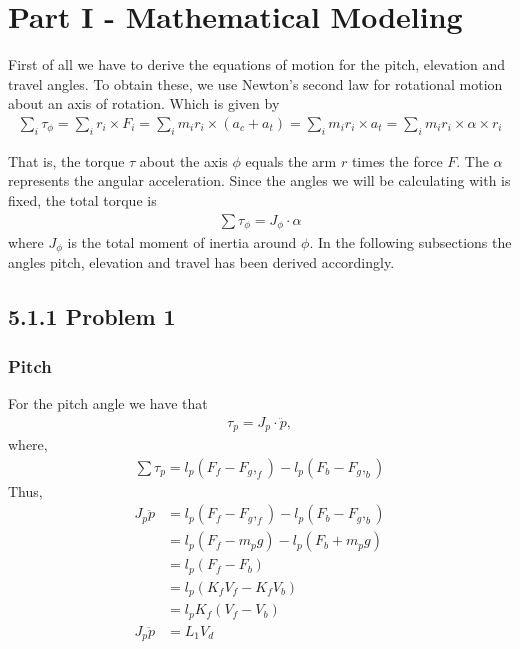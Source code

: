 \section*{Part I - Mathematical Modeling}
First of all we have to derive the equations of motion for the pitch, elevation and travel angles. To obtain these, we use Newton's second law for rotational motion about an axis of rotation. Which is given by
\begin{align*}
\sum_{i}\tau_\phi = \sum_{i}r_i\times F_i = \sum_{i}m_ir_i \times (a_c + a_t) = \sum_{i}m_ir_i \times a_t = \sum_{i}m_ir_i \times \alpha \times r_i
\end{align*} 

That is, the torque $\tau$ about the axis $\phi$ equals the arm $r$ times the force $F$. The $\alpha$ represents the angular acceleration. Since the angles we will be calculating with is fixed, the total torque is  
\begin{align*}
\sum\tau_\phi = J_\phi \cdot \alpha
\end{align*}
where $J_\phi$ is the total moment of inertia around $\phi$. In the following subsections the angles pitch, elevation and travel has been derived accordingly. 
\subsection*{5.1.1  Problem 1}
\subsubsection*{Pitch}
For the pitch angle we have that 
\begin{align*}
\tau_p = J_p\cdot \ddot{p},
\end{align*}
where,
\begin{align*}
\sum \tau_p = l_p(F_f-F_g,_f) - l_p(F_b-F_g,_b)
\end{align*}
Thus,
\begin{align*}
J_p \ddot{p} &= l_p(F_f-F_g,_f) - l_p(F_b-F_g,_b)\\
             &= l_p(F_f-m_pg) - l_p(F_b+ m_pg)\\
             &= l_p(F_f - F_b)\\
             &= l_p(K_fV_f - K_fV_b)\\
             &= l_pK_f(V_f - V_b)\\
J_p\ddot{p}  &= L_1V_d \tag{$2a$}\label{2a}
\end{align*}


